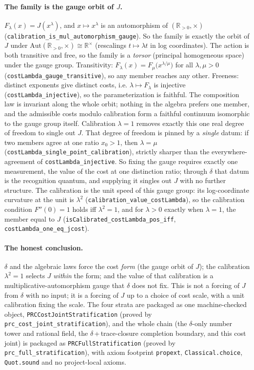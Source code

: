 \documentclass[11pt,a4paper]{article}
\theoremstyle{definition}
\theoremstyle{remark}
\begin{document}
\paragraph{The family is the gauge orbit of $J$.}
$F_\lambda(x) = J(x^\lambda)$, and $x \mapsto x^\lambda$ is an automorphism of
$(\mathbb{R}_{>0}, \times)$
(\texttt{calibration\_is\_mul\_automorphism\_gauge}). So the family is exactly the
orbit of $J$ under $\mathrm{Aut}(\mathbb{R}_{>0}, \times) \cong \mathbb{R}^\times$
(rescalings $t \mapsto \lambda t$ in log coordinates). The action is both transitive and free, so the family is a \emph{torsor}
(principal homogeneous space) under the gauge group. Transitivity:
$F_\lambda(x) = F_\mu\bigl(x^{\lambda/\mu}\bigr)$ for all $\lambda, \mu > 0$
(\texttt{costLambda\_gauge\_transitive}), so any member reaches any other.
Freeness: distinct exponents give distinct costs, i.e. $\lambda \mapsto F_\lambda$
is injective (\texttt{costLambda\_injective}), so the parameterization is
faithful. The composition law is invariant along the whole orbit; nothing in the
algebra prefers one member, and the admissible costs modulo calibration form a
faithful continuum isomorphic to the gauge group itself. Calibration $\lambda = 1$
removes exactly this one real degree of freedom to single out $J$. That degree of
freedom is pinned by a \emph{single} datum: if two members agree at one ratio
$x_0 > 1$, then $\lambda = \mu$ (\texttt{costLambda\_single\_point\_calibration}),
strictly sharper than the everywhere-agreement of \texttt{costLambda\_injective}.
So fixing the gauge requires exactly one measurement, the value of the cost at one
distinction ratio; through $\delta$ that datum is the recognition quantum, and
supplying it singles out $J$ with no further structure. The calibration is the
unit speed of this gauge group: its log-coordinate curvature at the unit is
$\lambda^2$ (\texttt{calibration\_value\_costLambda}), so the calibration
condition $F''(0)=1$ holds iff $\lambda^2 = 1$, and for $\lambda > 0$ exactly when
$\lambda = 1$, the member equal to $J$
(\texttt{isCalibrated\_costLambda\_pos\_iff}, \texttt{costLambda\_one\_eq\_jcost}).

\paragraph{The honest conclusion.}
$\delta$ and the algebraic laws force the cost \emph{form} (the gauge orbit of
$J$); the calibration $\lambda^2 = 1$ selects $J$ \emph{within} the form; and the
value of that calibration is a multiplicative-automorphism gauge that $\delta$
does not fix. This is not a forcing of $J$ from $\delta$ with no input; it is a
forcing of $J$ up to a choice of cost scale, with a unit calibration fixing the
scale. The four strata are packaged as one machine-checked object,
\texttt{PRCCostJointStratification} (proved by
\texttt{prc\_cost\_joint\_stratification}), and the whole chain (the $\delta$-only
number tower and rational field, the $\delta$\,+\,trace-closure completion
boundary, and this cost joint) is packaged as
\texttt{PRCFullStratification} (proved by \texttt{prc\_full\_stratification}),
with axiom footprint \texttt{propext}, \texttt{Classical.choice},
\texttt{Quot.sound} and no project-local axioms.
\end{document}
